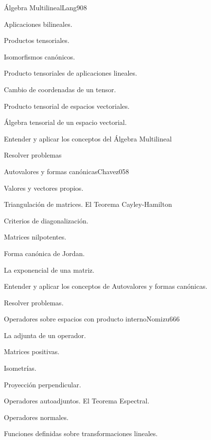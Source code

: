 \begin{syllabus}
\begin{unit}{Álgebra Multilineal}{Lang90}{8}
   \begin{topics}
         \item  Aplicaciones bilineales.
	 \item  Productos tensoriales.
         \item  Isomorfismos canónicos.
	 \item  Producto tensoriales de aplicaciones lineales.
         \item  Cambio de coordenadas de un tensor.
	 \item  Producto tensorial de espacios vectoriales.
         \item  Álgebra tensorial de un espacio vectorial.
   \end{topics}

   \begin{learningoutcomes}
         \item  Entender y aplicar los conceptos del Álgebra Multilineal
         \item  Resolver problemas
   \end{learningoutcomes}
\end{unit}

\begin{unit}{Autovalores y formas canónicas}{Chavez05}{8}
   \begin{topics}
	\item  Valores y vectores propios.
	\item  Triangulación de matrices. El Teorema Cayley-Hamilton
	\item  Criterios de diagonalización.
	\item  Matrices nilpotentes.
	\item Forma canónica de Jordan.
	\item La exponencial de una matriz.
   \end{topics}

   \begin{learningoutcomes}
         \item  Entender y aplicar los conceptos de Autovalores y formas canónicas.
         \item  Resolver problemas.
   \end{learningoutcomes}
\end{unit}

\begin{unit}{Operadores sobre espacios con producto interno}{Nomizu66}{6}
   \begin{topics}
	\item  La adjunta de un operador.
	\item  Matrices positivas.
	\item  Isometrías.
	\item  Proyección perpendicular.
	\item  Operadores autoadjuntos. El Teorema Espectral.
	\item  Operadores normales.
	\item Funciones definidas sobre transformaciones lineales.
   \end{topics}


\end{unit}
\end{syllabus}
